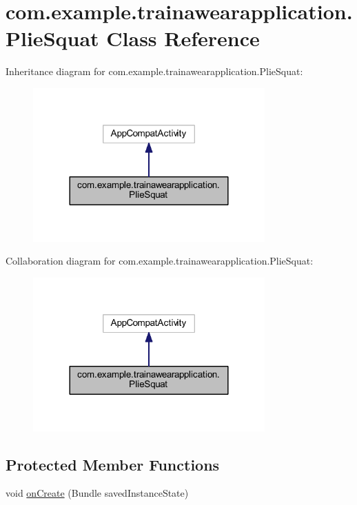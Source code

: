 \hypertarget{classcom_1_1example_1_1trainawearapplication_1_1_plie_squat}{}\section{com.\+example.\+trainawearapplication.\+Plie\+Squat Class Reference}
\label{classcom_1_1example_1_1trainawearapplication_1_1_plie_squat}


Inheritance diagram for com.\+example.\+trainawearapplication.\+Plie\+Squat\+:
\nopagebreak
\begin{figure}[H]
\begin{center}
\leavevmode
\includegraphics[width=252pt]{classcom_1_1example_1_1trainawearapplication_1_1_plie_squat__inherit__graph}
\end{center}
\end{figure}


Collaboration diagram for com.\+example.\+trainawearapplication.\+Plie\+Squat\+:
\nopagebreak
\begin{figure}[H]
\begin{center}
\leavevmode
\includegraphics[width=252pt]{classcom_1_1example_1_1trainawearapplication_1_1_plie_squat__coll__graph}
\end{center}
\end{figure}
\subsection*{Protected Member Functions}
\begin{DoxyCompactItemize}
\item 
void \mbox{\hyperlink{classcom_1_1example_1_1trainawearapplication_1_1_plie_squat_a3125f76f7d64ff641f8f07e2b8d5c3a7}{on\+Create}} (Bundle saved\+Instance\+State)
\end{DoxyCompactItemize}


